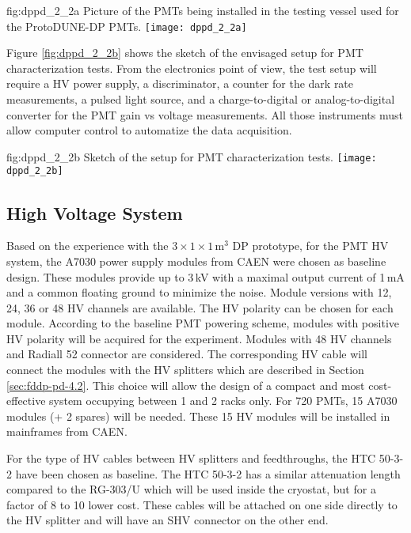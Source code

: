 \begin{dunefigure}{fig:dppd_2_2a}
{Picture of the PMTs being installed in the testing vessel used for the ProtoDUNE-DP PMTs.}
\texttt{[image: dppd\_2\_2a]}
\end{dunefigure}

Figure \ref{fig:dppd_2_2b} shows the sketch of the envisaged setup for PMT characterization tests. From the electronics point of view, the test setup will require a HV power supply, a discriminator, a counter for the dark rate measurements, a pulsed light source, and a charge-to-digital or analog-to-digital converter for the PMT gain vs voltage measurements. All those instruments must allow computer control to automatize the data acquisition.

\begin{dunefigure}{fig:dppd_2_2b}
{Sketch of the setup for PMT characterization tests.}
\texttt{[image: dppd\_2\_2b]}
\end{dunefigure}

\subsection{High Voltage System}
\label{sec:fddp-pd-2.3}

Based on the experience with the $3\times1\times1$\,m$^3$ DP prototype, for the PMT HV system, the A7030 power supply modules from CAEN \cite{caen-a7030} were chosen as baseline design. These modules provide up to 3\,kV with a maximal output current of 1\,mA and a common floating ground to minimize the noise. Module versions with 12, 24, 36 or 48 HV channels are available. The HV polarity can be chosen for each module. According to the baseline PMT powering scheme, modules with positive HV polarity will be acquired for the experiment. Modules with 48 HV channels and Radiall 52 connector are considered. The corresponding HV cable will connect the modules with the HV splitters which are described in Section \ref{sec:fddp-pd-4.2}. This choice will allow the design of a compact and most cost-effective system occupying between 1 and 2 racks only. For 720 PMTs, 15 A7030 modules (+ 2 spares) will be needed. These 15 HV modules will be installed in mainframes from CAEN.

For the type of HV cables between HV splitters and feedthroughs, the HTC 50-3-2 \cite{htc-50-3-2} have been chosen as baseline. The HTC 50-3-2 has a similar attenuation length compared to the RG-303/U \cite{rg303} which will be used inside the cryostat, but for a factor of 8 to 10 lower cost. These cables will be attached on one side directly to the HV splitter and will have an SHV connector on the other end.

